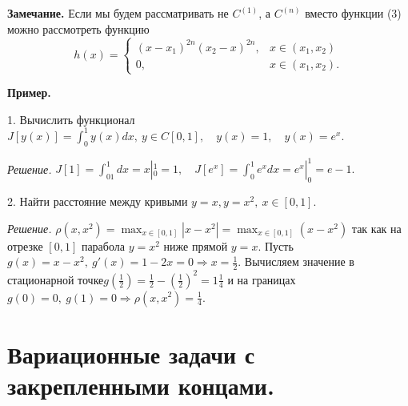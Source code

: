 \documentclass[9pt]{article}
\begin{document}
\par\textbf{Замечание.} Если мы будем рассматривать не \(C^{(1)}\), а \(C^{(n)}\) вместо функции (3) можно рассмотреть функцию\[h(x)=\left\{
\begin{array}{cc}
     (x-x_1)^{2n}(x_2-x)^{2n},&  x\in(x_1,x_2)\\
     0,& x\in(x_1,x_2).
\end{array}\right.\]
\par\textbf{Пример.}
\par1. Вычислить функционал \(J[y(x)]=\displaystyle\int^1_0y(x)dx,\ y\in C[0,1],\quad y(x)=1,\quad y(x)=e^x\).
\par\textit{Решение.} \(J[1]=\displaystyle\int^1_01dx=x|^1_0=1,\quad J[e^x]=\int^1_0e^xdx=e^x|_0^1=e-1.\)
\par2. Найти расстояние между кривыми \(y=x,y=x^2,\ x\in[0,1]\).
\par\textit{Решение.} \(\rho(x,x^2)=\max_{x\in[0,1]}|x-x^2|=\max_{x\in[0,1]}(x-x^2)\) так как на отрезке \([0,1]\) парабола \(y=x^2\) ниже прямой \(y=x\). Пусть \(g(x)=x-x^2,\ g'(x)=1-2x=0\Rightarrow x=\frac{1}{2}\). Вычисляем значение в стационарной точке\(g(\frac{1}{2})=\frac{1}{2}-(\frac{1}{2})^2=1\frac{1}{4}\) и на границах \(g(0)=0,\ g(1)=0 \Rightarrow \rho(x,x^2)=\frac{1}{4}\).

\section{Вариационные задачи с закрепленными концами.}
\end{document}
